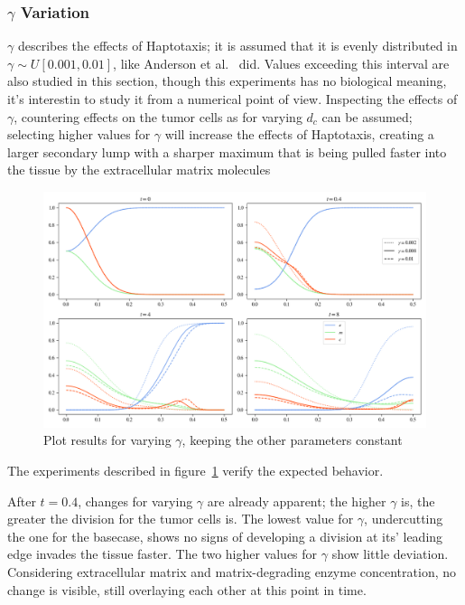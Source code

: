 \subsubsection*{$\gamma$ Variation}
$\gamma$ describes the effects of Haptotaxis; it is assumed that it is evenly distributed in $\gamma \sim U[0.001,0.01]$, like Anderson et al.~\cite{anderson_mathematical_2000} did. Values exceeding this interval are also studied in this section, though this experiments has no biological meaning, it's interestin to study it from a numerical point of view. Inspecting the effects of $\gamma$, countering effects on the tumor cells as for varying $d_c$ can be assumed; selecting higher values for $\gamma$ will increase the effects of Haptotaxis, creating a larger secondary lump with a sharper maximum that is being pulled faster into the tissue by the extracellular matrix molecules
\begin{figure}[h!]
 \centering
 \includegraphics[width=\textwidth]{resources/images/gamma_variation.png}
 \caption{Plot results for varying $\gamma$, keeping the other parameters constant}
 \label{fig:gamma_variation}
\end{figure}
The experiments described in figure~\ref{fig:gamma_variation} verify the expected behavior.

After $t=0.4$, changes for varying $\gamma$ are already apparent; the higher $\gamma$ is, the greater the division for the tumor cells is. The lowest value for $\gamma$, undercutting the one for the basecase, shows no signs of developing a division at its' leading edge invades the tissue faster. The two higher values for $\gamma$ show little deviation. Considering extracellular matrix and matrix-degrading enzyme concentration, no change is visible, still overlaying each other at this point in time.

